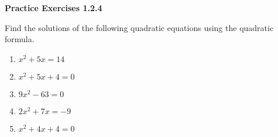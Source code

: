 \vspace{1ex}
\noindent\textbf{Practice Exercises 1.2.4}

\vspace{0.75ex}

Find the solutions of the following quadratic equations using the quadratic formula. 

\begin{multicols}{2}
\begin{enumerate}[label = \color{blue}\arabic*. ]
   \item $ x^2 + 5x = 14 $  
   \item $ x^2 + 5x + 4 = 0 $
   \item $ 9x^2 - 63 = 0 $
   \item $ 2x^2 + 7x = -9 $
   \item $ x^2 + 4x + 4 = 0 $
\end{enumerate}
\end{multicols}
				
				

